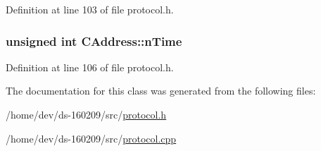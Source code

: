 Definition at line 103 of file protocol.\+h.

\hypertarget{class_c_address_ac1c44aac968b11f90ce529b133ae4e9b}{}
\subsubsection[{n\+Time}]{\setlength{\rightskip}{0pt plus 5cm}unsigned int C\+Address\+::n\+Time}\label{class_c_address_ac1c44aac968b11f90ce529b133ae4e9b}


Definition at line 106 of file protocol.\+h.



The documentation for this class was generated from the following files\+:\begin{DoxyCompactItemize}
\item 
/home/dev/ds-\/160209/src/\hyperlink{protocol_8h}{protocol.\+h}\item 
/home/dev/ds-\/160209/src/\hyperlink{protocol_8cpp}{protocol.\+cpp}\end{DoxyCompactItemize}
